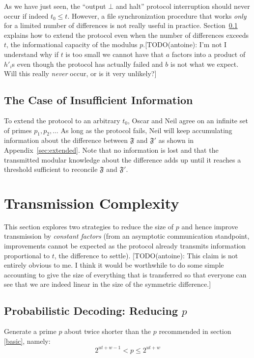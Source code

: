 \documentclass[11pt]{llncs}
\begin{document}
As we have just seen, the ``output $\bot$ and halt'' protocol interruption should never occur if indeed $t_0 \leq t$. However, a file synchronization procedure that works {\sl only} for a limited number of differences is not really useful in practice. Section~\ref{insuf} explains how to extend the protocol even when the number of differences exceeds $t$, the informational capacity of the modulus $p$.[TODO(antoine): I'm not I understand why if $t$ is too small we cannot have that $a$ factors into a product of $h'_i$s even though the protocol has actually failed and $b$ is not what we expect. Will this really \emph{never} occur, or is it very unlikely?]

\subsection{The Case of Insufficient Information}
\label{insuf}
To extend the protocol to an arbitrary $t_0$, Oscar and Neil agree on an infinite set of primes $p_1,p_2,\ldots$ As long as the protocol fails, Neil will keep accumulating information about the difference between $\mathfrak{F}$ and $\mathfrak{F}'$ as shown in Appendix~\ref{sec:extended}. Note that no information is lost and that the transmitted modular knowledge about the difference adds up until it reaches a threshold sufficient to reconcile $\mathfrak{F}$ and $\mathfrak{F}'$.\smallskip

\section{Transmission Complexity}

This section explores two strategies to reduce the size of $p$ and hence improve transmission by {\sl constant factors} (from an asymptotic communication standpoint, improvements cannot be expected as the protocol already transmits information proportional to $t$, the difference to settle). [TODO(antoine): This claim is not entirely obvious to me. I think it would be worthwhile to do some simple accounting to give the size of everything that is transferred so that everyone can see that we are indeed linear in the size of the symmetric difference.]

\subsection{Probabilistic Decoding: Reducing $p$}

Generate a prime $p$ about twice shorter than the $p$ recommended in section \ref{basic}, namely:
\begin{equation}
\label{eqnewp}
2^{ut+w-1}<p \leq 2^{ut+w}
\end{equation}
\end{document}
